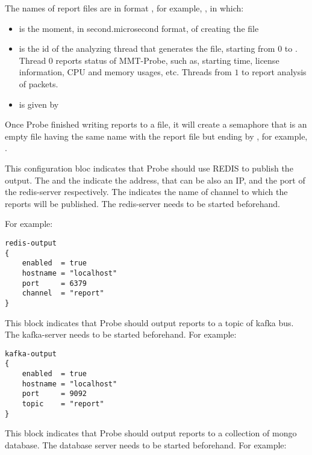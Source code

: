 The names of report files are in format ,
for example, , in which:
\begin{itemize} 
   \item {} is the moment, in second.microsecond format, of creating the file
   \item {} is the id of the analyzing thread that generates the file, starting from $0$ to . Thread $0$ reports status of MMT-Probe, such as, starting time, license information, CPU and memory usages, etc. Threads from $1$ to  report analysis of packets.
   \item {} is given by 
\end{itemize}

Once Probe finished writing reports to a file, it will create a semaphore that is an empty file having the same name with the report file but ending by ,
for example, . 


This configuration bloc indicates that Probe should use REDIS to publish the output. 
The  and the  indicate the address, that can be also an IP, 
 and the port of the redis-server respectively. The  indicates the name of channel to which the reports will be published.
The redis-server needs to be started beforehand.

For example:


\begin{lstlisting}[style=CONFIG]
redis-output
{
    enabled  = true
    hostname = "localhost"
    port     = 6379
    channel  = "report" 
}

\end{lstlisting}

This block indicates that Probe should output reports to a topic of kafka bus. 
The kafka-server needs to be started beforehand. For example:



\begin{lstlisting}[style=CONFIG]
kafka-output
{
    enabled  = true
    hostname = "localhost" 
    port     = 9092
    topic    = "report" 
}
\end{lstlisting}


This block indicates that Probe should output reports to a collection of mongo database.
The database server needs to be started beforehand. For example:



